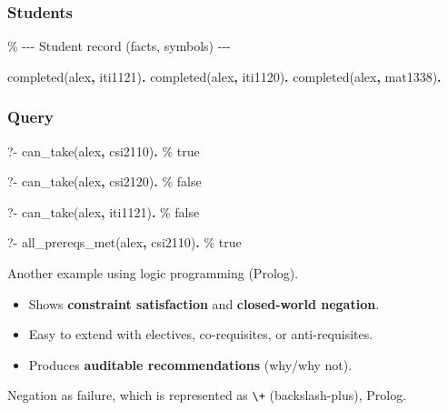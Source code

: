 \documentclass[
  letterpaper,
  DIV=11,
  numbers=noendperiod]{scrartcl}
\newenvironment{Shaded}{\begin{snugshade}}{\end{snugshade}}
\newcommand{\CommentTok}[1]{\textcolor[rgb]{0.37,0.37,0.37}{#1}}
\newcommand{\FunctionTok}[1]{\textcolor[rgb]{0.28,0.35,0.67}{#1}}
\newcommand{\KeywordTok}[1]{\textcolor[rgb]{0.00,0.23,0.31}{\textbf{#1}}}
\newcommand{\NormalTok}[1]{\textcolor[rgb]{0.00,0.23,0.31}{#1}}
\providecommand{\tightlist}{%
  \setlength{\itemsep}{0pt}\setlength{\parskip}{0pt}}
\begin{document}
\subsubsection{Students}\label{students}

\begin{Shaded}
\begin{Highlighting}[]
\CommentTok{\% {-}{-}{-} Student record (facts, symbols) {-}{-}{-}}

\NormalTok{completed(alex}\KeywordTok{,}\NormalTok{ iti1121)}\KeywordTok{.}
\NormalTok{completed(alex}\KeywordTok{,}\NormalTok{ iti1120)}\KeywordTok{.}
\NormalTok{completed(alex}\KeywordTok{,}\NormalTok{ mat1338)}\KeywordTok{.}
\end{Highlighting}
\end{Shaded}

\subsubsection{Query}\label{query-1}

\begin{Shaded}
\begin{Highlighting}[]
\FunctionTok{?{-}}\NormalTok{ can\_take(alex}\KeywordTok{,}\NormalTok{ csi2110)}\KeywordTok{.}
\CommentTok{\% true}

\FunctionTok{?{-}}\NormalTok{ can\_take(alex}\KeywordTok{,}\NormalTok{ csi2120)}\KeywordTok{.}
\CommentTok{\% false}

\FunctionTok{?{-}}\NormalTok{ can\_take(alex}\KeywordTok{,}\NormalTok{ iti1121)}\KeywordTok{.}
\CommentTok{\% false}

\FunctionTok{?{-}}\NormalTok{ all\_prereqs\_met(alex}\KeywordTok{,}\NormalTok{ csi2110)}\KeywordTok{.}
\CommentTok{\% true}
\end{Highlighting}
\end{Shaded}

Another example using logic programming (Prolog).

\begin{itemize}
\tightlist
\item
  Shows \textbf{constraint satisfaction} and \textbf{closed-world
  negation}.
\item
  Easy to extend with electives, co-requisites, or anti-requisites.
\item
  Produces \textbf{auditable recommendations} (why/why not).
\end{itemize}

Negation as failure, which is represented as \texttt{\textbackslash{}+}
(backslash-plus), Prolog.
\end{document}
